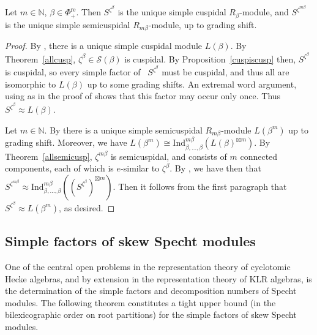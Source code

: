 \documentclass[Unicode,ALCO]{cedram}
\newcommand{\SSSS}{\mathcal{S}}
\newcommand{\0}{{\bar 0}}
\newcommand{\Ind}{{\mathrm {Ind}}}
\newcommand{\NN}{{\mathbb N}}
\def\re{{\mathrm{re}}}
\begin{document}
\begin{prop}\label{propcuspSpechtsimp}
Let \(m \in \NN\), \(\beta \in \Phi_+^\re\). Then \(S^{\zeta^\beta}\) is the unique simple cuspidal \(R_\beta\)-module, and \(S^{\zeta^{m\beta}}\) is the unique simple semicuspidal  \(R_{m \beta}\)-module, up to grading shift.
\end{prop}
\begin{proof}
By \cite[Theorem 5.2]{KlMuStrat}, there is a unique simple cuspidal module \(L(\beta)\). By Theorem~\ref{allcusp}, \(\zeta^\beta \in \SSSS(\beta)\) is cuspidal. By Proposition~\ref{cuspiscusp} then, \(S^{\zeta^\beta}\) is cuspidal, so every simple factor of \ \(S^{\zeta^\beta}\) must be cuspidal, and thus all are isomorphic to \(L(\beta)\) up to some grading shifts. An extremal word argument, using \cite[Lemma 2.28]{KlCuspSys} as in the proof of \cite[Lemma~8.3]{MuSkew} shows that this factor may occur only once. Thus  \(S^{\zeta^\beta} \approx L(\beta)\).

Let \(m \in \NN\). By \cite[Theorem 5.2]{KlMuStrat} there is a unique simple semicuspidal \(R_{m \beta}\)-module \(L(\beta^m)\) up to grading shift. Moreover, we have \(L(\beta^m) \cong \Ind_{\beta, \ldots, \beta}^{m \beta}(L(\beta)^{\boxtimes m})\). By Theorem~\ref{allsemicusp}, \(\zeta^{m\beta}\) is semicuspidal, and consists of \(m\) connected components, each of which is \(e\)-similar to \(\zeta^\beta\). By \cite[Theorem~5.15]{MuSkew}, we have then that \(S^{\zeta^{m \beta}} \approx \Ind_{\beta, \ldots, \beta}^{m\beta}((S^{\zeta^\beta})^{\boxtimes m})\). Then it follows from the first paragraph that \(S^{\zeta^\beta} \approx L(\beta^m)\), as desired.
\end{proof}

\subsection{Simple factors of skew Specht modules}
One of the central open problems in the representation theory of cyclotomic Hecke algebras, and by extension in the representation theory of KLR algebras, is the determination of the simple factors and decomposition numbers of Specht modules. 
The following theorem constitutes a tight upper bound (in the bilexicographic order on root partitions) for the simple factors of skew Specht modules.
\end{document}
